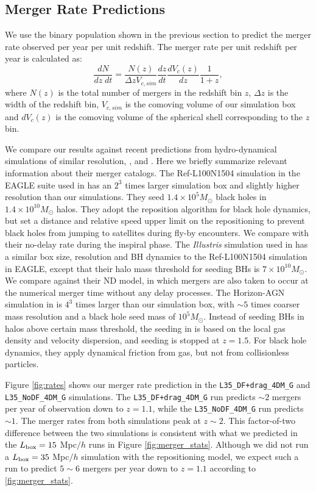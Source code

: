 \subsection{Merger Rate Predictions}
\label{subsec:L35_rates}
We use the binary population shown in the previous section to predict the merger rate observed per year per unit redshift.
The merger rate per unit redshift per year is calculated as:
\begin{equation}
     \frac{dN}{dz\;dt} =  \frac{N(z)}{\Delta z V_{c,sim}} \frac{dz}{dt} \frac{dV_c(z)}{dz}\frac{1}{1+z},
\end{equation}
where $N(z)$ is the total number of mergers in the redshift bin $z$, $\Delta z$ is the width of the redshift bin, $V_{c,sim}$ is the comoving volume of our simulation box and $dV_c(z)$ is the comoving volume of the spherical shell corresponding to the $z$ bin. 

We compare our results against recent predictions from hydro-dynamical simulations of similar resolution, \cite{Salcido2016}, \cite{Katz2020} and \cite{Volonteri2020}. Here we briefly summarize relevant information about their merger catalogs. The Ref-L100N1504 simulation in the EAGLE suite used in \cite{Salcido2016} has an $2^3$ times larger simulation box and slightly higher resolution than our simulations. They seed $1.4\times 10^5M_\odot$ black holes in $1.4\times 10^{10}M_\odot$ halos. They adopt the reposition algorithm for black hole dynamics, but set a distance and relative speed upper limit on the repositioning to prevent black holes from jumping to satellites during fly-by encounters. We compare with their no-delay rate during the inspiral phase. The \textit{Illustris} simulation used in \cite{Katz2020} has a similar box size, resolution and BH dynamics to the Ref-L100N1504 simulation in EAGLE, except that their halo mass threshold for seeding BHs is $7\times 10^{10} M_\odot$. We compare against their ND model, in which mergers are also taken to occur at the numerical merger time without any delay processes. The Horizon-AGN simulation in \cite{Volonteri2020} is $4^3$ times larger than our simulation box, with $\sim 5$ times coarser mass resolution and a black hole seed mass of $10^5 M_\odot$. Instead of seeding BHs in halos above certain mass threshold, the seeding in \cite{Volonteri2020} is based on the local gas density and velocity dispersion, and seeding is stopped at $z=1.5$. For black hole dynamics, they apply dynamical friction from gas, but not from collisionless particles.

Figure \ref{fig:rates} shows our merger rate prediction in the \texttt{L35\_DF+drag\_4DM\_G} and  \texttt{L35\_NoDF\_4DM\_G} simulations. The \texttt{L35\_DF+drag\_4DM\_G} run predicts $\sim 2$ mergers per year of observation down to $z=1.1$, while the \texttt{L35\_NoDF\_4DM\_G} run predicts $\sim 1$. The merger rates from both simulations peak at $z\sim 2$. This factor-of-two difference between the two simulations is consistent with what we predicted in the $L_{\rm box} = 15$ Mpc$/h$ runs in Figure \ref{fig:merger_stats}. Although we did not run a $L_{\rm box} = 35$ Mpc$/h$ simulation with the repositioning model, we expect such a run to predict $5\sim 6$ mergers per year down to $z=1.1$ according to \ref{fig:merger_stats}.


